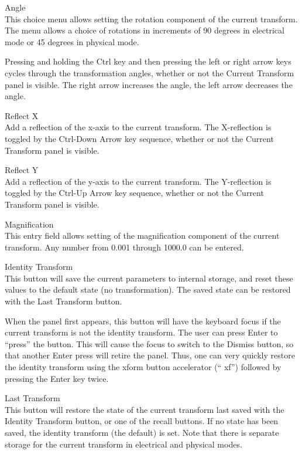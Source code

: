 \begin{description}
\item{\cb Angle}\\
This choice menu allows setting the rotation component of the current
transform.  The menu allows a choice of rotations in increments of 90
degrees in electrical mode or 45 degrees in physical mode.

Pressing and holding the {\kb Ctrl} key and then pressing the left or
right arrow keys cycles through the transformation angles, whether or
not the {\cb Current Transform} panel is visible.  The right arrow
increases the angle, the left arrow decreases the angle.

\item{\cb Reflect X}\\
Add a reflection of the x-axis to the current transform.  The
X-reflection is toggled by the {\kb Ctrl-Down Arrow} key sequence,
whether or not the {\cb Current Transform} panel is visible.

\item{\cb Reflect Y}\\
Add a reflection of the y-axis to the current transform.  The
Y-reflection is toggled by the {\kb Ctrl-Up Arrow} key sequence,
whether or not the {\cb Current Transform} panel is visible.

\item{\cb Magnification}\\
This entry field allows setting of the magnification component of the
current transform.  Any number from 0.001 through 1000.0 can be
entered.

\item{\cb Identity Transform}\\
This button will save the current parameters to internal storage, and
reset these values to the default state (no transformation).  The
saved state can be restored with the {\cb Last Transform} button.

When the panel first appears, this button will have the keyboard focus
if the current transform is not the identity transform.  The user can
press {\kb Enter} to ``press'' the button.  This will cause the focus
to switch to the {\cb Dismiss} button, so that another {\kb Enter}
press will retire the panel.  Thus, one can very quickly restore the
identity transform using the {\cb xform} button accelerator (``{\vt
xf}'') followed by pressing the {\kb Enter} key twice.

\item{\cb Last Transform}\\
This button will restore the state of the current transform last saved
with the {\cb Identity Transform} button, or one of the recall
buttons.  If no state has been saved, the identity transform (the
default) is set.  Note that there is separate storage for the current
transform in electrical and physical modes.


\end{description}
